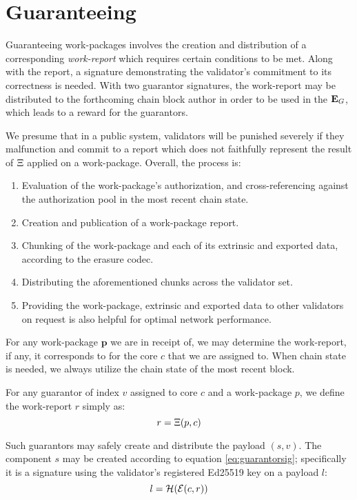 \section{Guaranteeing}\label{sec:guaranteeing}

Guaranteeing work-packages involves the creation and distribution of a corresponding \emph{work-report} which requires certain conditions to be met. Along with the report, a signature demonstrating the validator's commitment to its correctness is needed. With two guarantor signatures, the work-report may be distributed to the forthcoming \Jam chain block author in order to be used in the $\mathbf{E}_G$, which leads to a reward for the guarantors.

We presume that in a public system, validators will be punished severely if they malfunction and commit to a report which does not faithfully represent the result of $\Xi$ applied on a work-package. Overall, the process is:

\begin{enumerate}
    \item Evaluation of the work-package's authorization, and cross-referencing against the authorization pool in the most recent \Jam chain state.
    \item Creation and publication of a work-package report.
    \item Chunking of the work-package and each of its extrinsic and exported data, according to the erasure codec.
    \item Distributing the aforementioned chunks across the validator set.
    \item Providing the work-package, extrinsic and exported data to other validators on request is also helpful for optimal network performance.
\end{enumerate}

For any work-package $\mathbf{p}$ we are in receipt of, we may determine the work-report, if any, it corresponds to for the core $c$ that we are assigned to. When \Jam chain state is needed, we always utilize the chain state of the most recent block.

For any guarantor of index $v$ assigned to core $c$ and a work-package $p$, we define the work-report $r$ simply as:
\begin{equation}
  r = \Xi(p, c)
\end{equation}

Such guarantors may safely create and distribute the payload $(s, v)$. The component $s$ may be created according to equation \ref{eq:guarantorsig}; specifically it is a signature using the validator's registered Ed25519 key on a payload $l$:
\begin{equation}
  l = \mathcal{H}(\mathcal{E}(c, r))
\end{equation}

